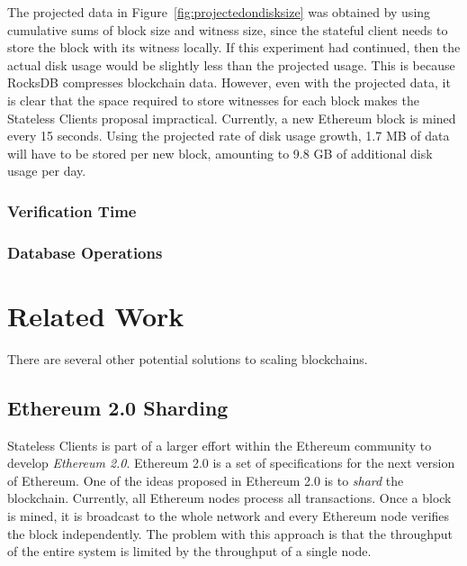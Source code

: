 \documentclass[12pt]{article}
\newcommand{\System}{Stateless Clients\xspace}
\begin{document}
The projected data in Figure~\ref{fig:projectedondisksize} was obtained by using cumulative sums of block size and witness size, since the stateful client needs to store the block with its witness locally. If this experiment had continued, then the actual disk usage would be slightly less than the projected usage. This is because RocksDB compresses blockchain data. However, even with the projected data, it is clear that the space required to store witnesses for each block makes the \System proposal impractical. Currently, a new Ethereum block is mined every 15 seconds. Using the projected rate of disk usage growth, 1.7 MB of data will have to be stored per new block, amounting to 9.8 GB of additional disk usage per day.

\subsubsection{Verification Time}

\subsubsection{Database Operations}

\section{Related Work}

There are several other potential solutions to scaling blockchains.

\subsection{Ethereum 2.0 Sharding}

\iffalse

\System is part of a larger effort within the Ethereum community to develop \emph{Ethereum 2.0}. Ethereum 2.0 is a set of specifications for the next version of Ethereum. One of the ideas proposed in Ethereum 2.0 is to \emph{shard} the blockchain. Currently, all Ethereum nodes process all transactions. Once a block is mined, it is broadcast to the whole network and every Ethereum node verifies the block independently. The problem with this approach is that the throughput of the entire system is limited by the throughput of a single node.
\end{document}
